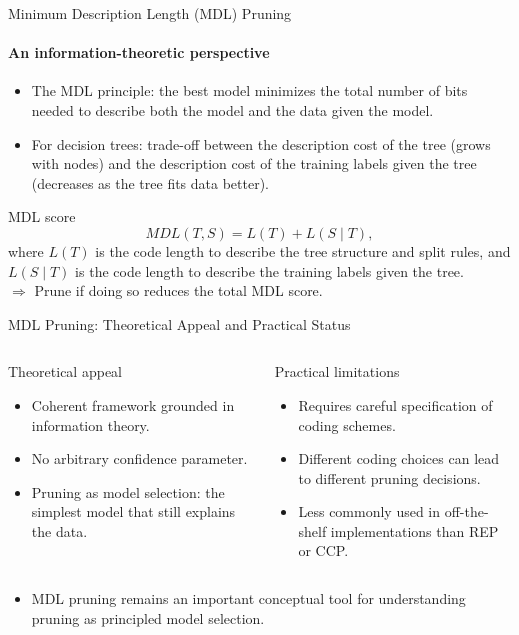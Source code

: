 \begin{frame}{Minimum Description Length (MDL) Pruning}
  \framesubtitle{An information-theoretic perspective}
  \begin{itemize}
    \item The \alert{MDL principle}: the best model minimizes the total number of bits needed to
          describe both the model and the data given the model.
    \item For decision trees: trade-off between the \alert{description cost of the tree} (grows
          with nodes) and the \alert{description cost of the training labels given the tree}
          (decreases as the tree fits data better).
  \end{itemize}
  \begin{block}{MDL score}
    \[
      MDL(T, S) = L(T) + L(S \mid T),
    \]
    where $L(T)$ is the code length to describe the tree structure and split rules, and
    $L(S \mid T)$ is the code length to describe the training labels given the tree.\\
    $\Rightarrow$ Prune if doing so \alert{reduces the total MDL score}.
  \end{block}
\end{frame}

\begin{frame}{MDL Pruning: Theoretical Appeal and Practical Status}
  \begin{columns}[t]
      \begin{block}{Theoretical appeal}
        \begin{itemize}
          \item Coherent framework grounded in \alert{information theory}.
          \item No arbitrary confidence parameter.
          \item Pruning as \alert{model selection}: the simplest model that still explains the data.
        \end{itemize}
      \end{block}
      \begin{alertblock}{Practical limitations}
        \begin{itemize}
          \item Requires careful specification of \alert{coding schemes}.
          \item Different coding choices can lead to different pruning decisions.
          \item Less commonly used in off-the-shelf implementations than REP or CCP.
        \end{itemize}
      \end{alertblock}
  \end{columns}
  \vspace{0.4em}
  \begin{itemize}
    \item MDL pruning remains an important conceptual tool for understanding pruning as
          \alert{principled model selection}.
  \end{itemize}
\end{frame}

